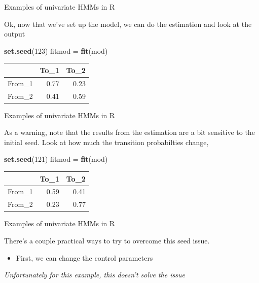 \documentclass[
  ignorenonframetext,
]{beamer}
\newenvironment{Shaded}{\begin{snugshade}}{\end{snugshade}}
\newcommand{\DecValTok}[1]{\textcolor[rgb]{0.00,0.00,0.81}{#1}}
\newcommand{\KeywordTok}[1]{\textcolor[rgb]{0.13,0.29,0.53}{\textbf{#1}}}
\newcommand{\NormalTok}[1]{#1}
\newcommand{\StringTok}[1]{\textcolor[rgb]{0.31,0.60,0.02}{#1}}
\providecommand{\tightlist}{%
  \setlength{\itemsep}{0pt}\setlength{\parskip}{0pt}}
\begin{document}
\begin{frame}[fragile]{Examples of univariate HMMs in R}
\protect\hypertarget{examples-of-univariate-hmms-in-r-11}{}

Ok, now that we've set up the model, we can do the estimation and look
at the output

\begin{Shaded}
\begin{Highlighting}[]
\KeywordTok{set.seed}\NormalTok{(}\DecValTok{123}\NormalTok{)}
\NormalTok{fitmod =}\StringTok{ }\KeywordTok{fit}\NormalTok{(mod)}
\end{Highlighting}
\end{Shaded}

\begin{longtable}[]{@{}lrr@{}}
\toprule
& To\_1 & To\_2\tabularnewline
\midrule
\endhead
From\_1 & 0.77 & 0.23\tabularnewline
From\_2 & 0.41 & 0.59\tabularnewline
\bottomrule
\end{longtable}

\end{frame}

\begin{frame}[fragile]{Examples of univariate HMMs in R}
\protect\hypertarget{examples-of-univariate-hmms-in-r-12}{}

As a warning, note that the results from the estimation are a bit
sensitive to the initial seed. Look at how much the transition
probabilties change,

\begin{Shaded}
\begin{Highlighting}[]
\KeywordTok{set.seed}\NormalTok{(}\DecValTok{121}\NormalTok{)}
\NormalTok{fitmod =}\StringTok{ }\KeywordTok{fit}\NormalTok{(mod)}
\end{Highlighting}
\end{Shaded}

\begin{longtable}[]{@{}lrr@{}}
\toprule
& To\_1 & To\_2\tabularnewline
\midrule
\endhead
From\_1 & 0.59 & 0.41\tabularnewline
From\_2 & 0.23 & 0.77\tabularnewline
\bottomrule
\end{longtable}

\end{frame}

\begin{frame}{Examples of univariate HMMs in R}
\protect\hypertarget{examples-of-univariate-hmms-in-r-13}{}

There's a couple practical ways to try to overcome this seed issue.

\begin{itemize}
\tightlist
\item
  First, we can change the control parameters
\end{itemize}

\emph{Unfortunately for this example, this doesn't solve the issue}

\end{frame}
\end{document}

